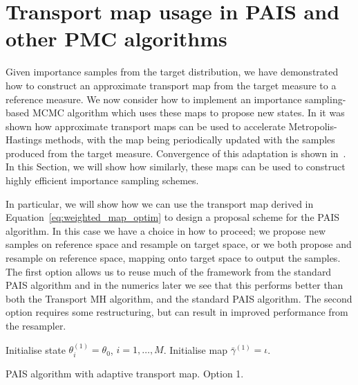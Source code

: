 \documentclass[final]{siamltex}
\begin{document}
\section[Transport map MCMC]{Transport map usage in PAIS
  and other PMC algorithms}\label{sec:TPAIS}

Given importance samples from the target distribution, we have demonstrated how to construct an approximate transport map from the
target measure to a reference measure. We now consider how to
implement an importance sampling-based MCMC algorithm which uses
these maps to propose new states. In \cite{parno2014transport} it was
shown how approximate transport maps can be used to accelerate
Metropolis-Hastings methods, with the map being periodically updated
with the samples produced from the target measure. Convergence of this
adaptation is shown in~\cite{parno2014transport}. In this Section, we
will show how similarly, these maps can be used to construct highly
efficient importance sampling schemes.

In particular, we will show how we can use the transport map derived in Equation~\eqref{eq:weighted_map_optim} to
design a proposal scheme for the PAIS algorithm. In this case we have a choice in how to proceed; we
propose new samples on reference space and resample on target space, or we both propose and resample on reference space, mapping onto target space to output the samples. The first option allows us to reuse much of the framework
from the standard PAIS algorithm and in the numerics later we see that this performs better than
both the Transport MH algorithm, and the standard PAIS algorithm. The second option requires some
restructuring, but can result in improved performance from the resampler.

\begin{table}
\begin{algorithm}[H]
\DontPrintSemicolon
\BlankLine
Initialise state $\theta^{(1)}_i = \theta_0$, \quad $i = 1,\dots,M$.\;
Initialise map $\bar{\gamma}^{(1)} = \iota$.\;
\caption{PAIS algorithm with adaptive transport map. Option 1.\label{alg:TransportPAIS1}}
\end{algorithm}
\end{table}
\end{document}
